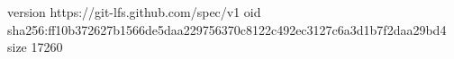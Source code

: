 version https://git-lfs.github.com/spec/v1
oid sha256:ff10b372627b1566de5daa229756370c8122c492ec3127c6a3d1b7f2daa29bd4
size 17260
